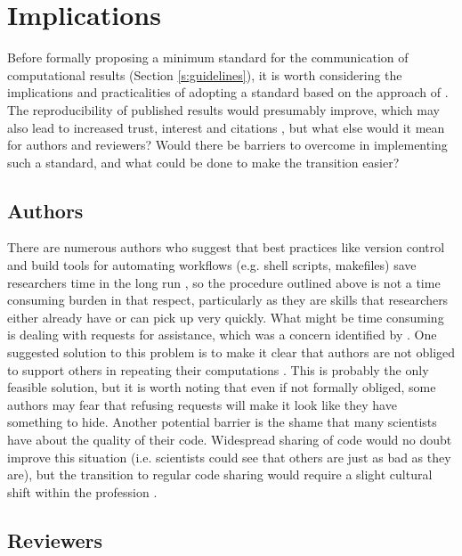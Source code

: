 \section{Implications}

Before formally proposing a minimum standard for the communication of computational results (Section \ref{s:guidelines}), it is worth considering the implications and practicalities of adopting a standard based on the approach of \citet{Irving2016}. The reproducibility of published results would presumably improve, which may also lead to increased trust, interest and citations \citep{Piwowar2007}, but what else would it mean for authors and reviewers? Would there be barriers to overcome in implementing such a standard, and what could be done to make the transition easier?

\subsection{Authors}

There are numerous authors who suggest that best practices like version control and build tools for automating workflows (e.g. shell scripts, makefiles) save researchers time in the long run \citep[e.g.][]{Sandve2013,Wilson2014a}, so the procedure outlined above is not a time consuming burden in that respect, particularly as they are skills that researchers either already have or can pick up very quickly. What might be time consuming is dealing with requests for assistance, which was a concern identified by \citet{Stodden2010}. One suggested solution to this problem is to make it clear that authors are not obliged to support others in repeating their computations \citep{Easterbrook2014}. This is probably the only feasible solution, but it is worth noting that even if not formally obliged, some authors may fear that refusing requests will make it look like they have something to hide. Another potential barrier is the shame that many scientists have about the quality of their code. Widespread sharing of code would no doubt improve this situation (i.e. scientists could see that others are just as bad as they are), but the transition to regular code sharing would require a slight cultural shift within the profession \citep{Barnes2010}.

\subsection{Reviewers}

